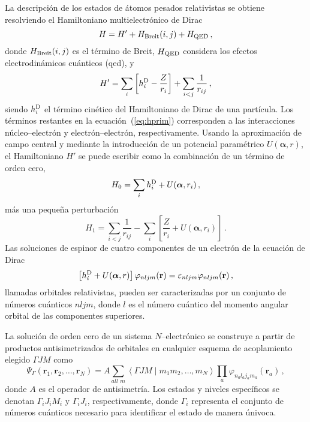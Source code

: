 La descripción de los estados de átomos pesados relativistas se 
obtiene resolviendo el Hamiltoniano multielectrónico de 
Dirac~\cite{Klapisch:77,Koenig:72,Klapisch:71,Klapisch:67}
\begin{equation}
 H = H' + H_{\mathrm{\mbox{\scriptsize Breit}}}(i,j) +
 H_{\mbox{\scriptsize QED}}\,,
\label{eq:htot}
\end{equation}
donde $H_{\mathrm{\mbox{\scriptsize Breit}}}(i,j)$ es el término de 
Breit, $H_{\mbox{\scriptsize QED}}$ considera los efectos 
electrodinámicos cuánticos (\acs{qed}), y
\begin{equation}
 H' = \sum_i \left[ h_i^{\mbox{\scriptsize D}} - \frac{Z}{r_i}\right]
 + \sum_{i<j}\frac{1}{r_{ij}}\,,
\label{eq:HDirac}
\end{equation}
siendo $h_i^{\mbox{\scriptsize D}}$ el término cinético del 
Hamiltoniano de Dirac de una partícula. Los términos restantes en la
ecuación~(\ref{eq:hprim}) corresponden a las interacciones 
núcleo--electrón y electrón--electrón, respectivamente. Usando la 
aproximación de campo central y mediante la introducción de un potencial 
paramétrico $U(\boldsymbol{\alpha},r)$, el Hamiltoniano $H'$ se puede escribir como la 
combinación de un término de orden cero, 
\begin{equation}
 H_0 = \sum_i h_i^{\mbox{\scriptsize D}} + U(\boldsymbol{\alpha},r_i)\,,
\end{equation}
más una pequeña perturbación
\begin{equation}
 H_1 = \sum_{i<j}\frac{1}{r_{ij}}
 - \sum_i \left[ \frac{Z}{r_i} + U(\boldsymbol{\alpha},r_i) \right]\,.
\end{equation}
Las soluciones de espinor de cuatro componentes de un electrón de la 
ecuación de Dirac
\begin{equation}
\left[ h_i^{\mbox{\scriptsize D}} +U(\boldsymbol{\alpha},r) \right] \varphi_{nljm}(\mathbf{r}) 
= \varepsilon_{nljm} \varphi_{nljm}(\mathbf{r})\,,
\label{eq:ecuacionDirac}
\end{equation}
llamadas orbitales relativistas, pueden ser caracterizadas por un 
conjunto de números cuánticos $nljm$, donde $l$ es el número cuántico 
del momento angular orbital de las componentes superiores. 

La solución de orden cero de un sistema $N$--electrónico se construye a 
partir de productos antisimetrizados de orbitales en cualquier esquema 
de acoplamiento elegido $\Gamma JM$ como 
\begin{equation}
\Psi_{\Gamma}\left(\mathbf{r}_1, \mathbf{r}_2, \ldots, \mathbf{r}_N\right)=A \sum_{all\,\,m}\left\langle\Gamma J M \mid m_1 m_2, \ldots, m_{N}\right\rangle \prod_{a} \varphi_{n_a l_a j_a m_a}\left(\mathbf{r}_a\right)\,,
\end{equation}
donde $A$ es el operador de antisimetría. Los estados y niveles 
específicos se denotan $\Gamma_iJ_iM_i$ y $\Gamma_iJ_i$, respectivamente,
donde $\Gamma_i$ representa el conjunto de números cuánticos necesario 
para identificar el estado de manera únivoca. 

